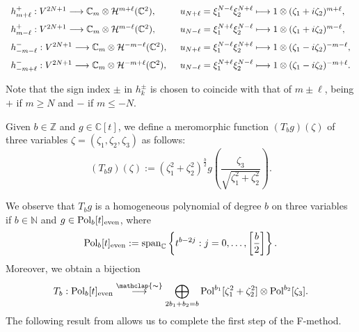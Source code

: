 \documentclass[12pt, pdflatex, a4paper]{article}
\theoremstyle{plain}
\theoremstyle{definition}
\def\C{{\mathbb C}}
\def\Harm{\mathcal{H}}
\def\N{{\mathbb N}}
\def\Pol{\text{\normalfont{Pol}}}
\def\spanned{\text{\normalfont{span}}}
\def\Z{{\mathbb Z}}
\newcommand\arrowsimeq{\stackrel{\mathclap{\thicksim}}{\longrightarrow}}
\begin{document}
\begin{equation}\label{generators-Hom(V2N+1,CmHk)}
\begin{array}{l l}
h_{m+\ell}^+: V^{2N+1} \longrightarrow \C_m \otimes \Harm^{m+\ell}(\C^2), &\enspace
u_{N+\ell}=\xi_1^{N-\ell}\xi_2^{N+\ell} \longmapsto 1 \otimes(\zeta_1 + i\zeta_2)^{m+\ell},\\[7pt]
h_{m-\ell}^+: V^{2N+1} \longrightarrow \C_m \otimes \Harm^{m-\ell}(\C^2), &\enspace
u_{N-\ell} = \xi_1^{N+\ell}\xi_2^{N-\ell} \longmapsto 1 \otimes (\zeta_1 + i\zeta_2)^{m-\ell},\\[7pt]
h_{-m-\ell}^-: V^{2N+1} \longrightarrow \C_m \otimes \Harm^{-m-\ell}(\C^2), &\enspace
u_{N+\ell} = \xi_1^{N-\ell}\xi_2^{N+\ell} \longmapsto 1 \otimes (\zeta_1 - i\zeta_2)^{-m-\ell},\\[7pt]
h_{-m+\ell}^-: V^{2N+1} \longrightarrow \C_m \otimes \Harm^{-m+\ell}(\C^2), &\enspace
u_{N-\ell}= \xi_1^{N+\ell}\xi_2^{N-\ell} \longmapsto 1 \otimes(\zeta_1 - i\zeta_2)^{-m+\ell}.
\end{array}
\end{equation}

Note that the sign index $\pm$ in $h_k^\pm$ is chosen to coincide with that of $m\pm\ell$, being $+$ if $m \geq N$ and $-$ if $m\leq -N$.

Given $b\in \Z$ and $g \in \C[t]$, we define a meromorphic function $(T_bg)(\zeta)$ of three variables $\zeta = (\zeta_1, \zeta_2,\zeta_3)$ as follows:
\begin{equation}\label{def-T_b}
(T_bg)(\zeta) := (\zeta_1^2+\zeta_2^2)^\frac{b}{2} g\left(\frac{\zeta_3}{\sqrt{\zeta_1^2+\zeta_2^2}}\right).
\end{equation}

We observe that $T_bg$ is a homogeneous polynomial of degree $b$ on three variables if $b \in \N$ and $g \in \Pol_b[t]_\text{{\normalfont{even}}}$, where
\begin{equation}\label{def-Pol_even}
\Pol_b[t]_\text{{\normalfont{even}}}:= \spanned_\C\left\{t^{b-2j}: j = 0, \dots, \left[\frac{b}{2}\right]\right\}.
\end{equation}
Moreover, we obtain a bijection
\begin{equation}\label{bijection-T_b}
T_b: \Pol_b[t]_\text{{\normalfont{even}}} \arrowsimeq \bigoplus_{2b_1+b_2 = b} \Pol^{b_1}[\zeta_1^2 + \zeta_2^2]\otimes\Pol^{b_2}[\zeta_3].
\end{equation}
The following result from \cite{Per-Val24} allows us to complete the first step of the F-method.
\end{document}
